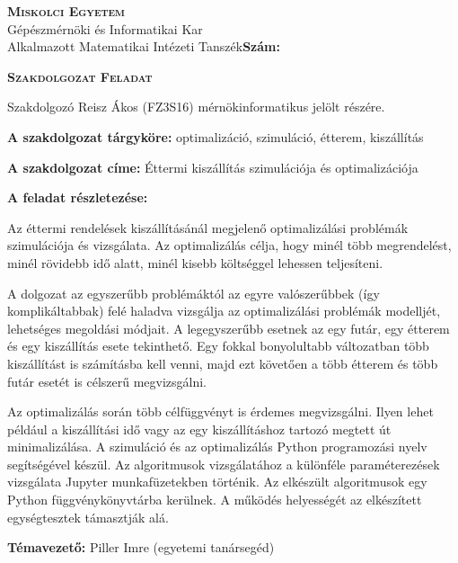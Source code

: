 \begin{flushleft}
\textsc{\bfseries Miskolci Egyetem}\\
Gépészmérnöki és Informatikai Kar\\
Alkalmazott Matematikai Intézeti Tanszék\hspace*{4cm}\hfil \textbf{Szám:}
\end{flushleft}
\vskip 0.5cm
\begin{center}
\large\textsc{\bfseries Szakdolgozat Feladat}
\end{center}
\vskip 0.5cm
Szakdolgozó Reisz Ákos (FZ3S16) mérnökinformatikus jelölt részére.\newline

\noindent\textbf{A szakdolgozat tárgyköre:} optimalizáció, szimuláció, étterem, kiszállítás\newline

\noindent\textbf{A szakdolgozat címe:} Éttermi kiszállítás szimulációja és optimalizációja\newline

\noindent\textbf{A feladat részletezése:}

Az éttermi rendelések kiszállításánál megjelenő optimalizálási problémák szimulációja és vizsgálata. Az optimalizálás célja, hogy minél több megrendelést, minél rövi\-debb idő alatt, minél kisebb költséggel lehessen teljesíteni.

A dolgozat az egyszerűbb problémáktól az egyre valószerűbbek (így komplikáltabbak) felé haladva vizsgálja az optimalizálási problémák modelljét, lehetséges megoldási módjait. A legegyszerűbb esetnek az egy futár, egy étterem és egy kiszállítás esete tekinthető. Egy fokkal bonyolultabb változatban több kiszállítást is számításba kell venni, majd ezt követően a több étterem és több futár esetét is célszerű megvizsgálni.

Az optimalizálás során több célfüggvényt is érdemes megvizsgálni. Ilyen lehet pél\-dául a kiszállítási idő vagy az egy kiszállításhoz tartozó megtett út minimalizálása.
A szimuláció és az optimalizálás Python programozási nyelv segítségével készül. Az algoritmusok vizsgálatához a különféle paraméterezések vizsgálata Jupyter munkafüze\-tek\-ben történik. Az elkészült algoritmusok egy Python függvénykönyvtárba kerülnek. A működés helyességét az elkészített egységtesztek támasztják alá.

\vfill

\noindent\textbf{Témavezető:} Piller Imre (egyetemi tanársegéd) \newline

